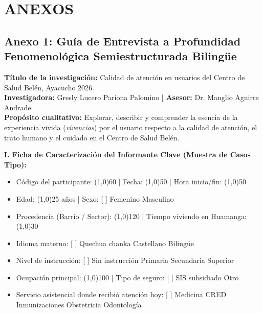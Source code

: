 \appendix
\section*{ANEXOS}
\label{sec:anexos}

\subsection*{Anexo 1: Guía de Entrevista a Profundidad Fenomenológica Semiestructurada Bilingüe}
\label{anx:1_guia}

\noindent\textbf{Título de la investigación:} Calidad de atención en usuarios del Centro de Salud Belén, Ayacucho 2026.\\
\textbf{Investigadora:} Gresly Lucero Pariona Palomino \quad | \quad \textbf{Asesor:} Dr. Manglio Aguirre Andrade.\\
\textbf{Propósito cualitativo:} Explorar, describir y comprender la esencia de la experiencia vivida (\textit{vivencias}) por el usuario respecto a la calidad de atención, el trato humano y el cuidado en el Centro de Salud Belén.

\vspace{0.3cm}
\noindent\textbf{I. Ficha de Caracterización del Informante Clave (Muestra de Casos Tipo):}
\begin{itemize}
    \item Código del participante: \line(1,0){60} \quad | \quad Fecha: \line(1,0){50} \quad | \quad Hora inicio/fin: \line(1,0){50}
    \item Edad: \line(1,0){25} años \quad | \quad Sexo: [ \phantom{X} ] Femenino \quad [ \phantom{X} ] Masculino
    \item Procedencia (Barrio / Sector): \line(1,0){120} \quad | \quad Tiempo viviendo en Huamanga: \line(1,0){30}
    \item Idioma materno: [ \phantom{X} ] Quechua chanka \quad [ \phantom{X} ] Castellano \quad [ \phantom{X} ] Bilingüe
    \item Nivel de instrucción: [ \phantom{X} ] Sin instrucción \quad [ \phantom{X} ] Primaria \quad [ \phantom{X} ] Secundaria \quad [ \phantom{X} ] Superior
    \item Ocupación principal: \line(1,0){100} \quad | \quad Tipo de seguro: [ \phantom{X} ] SIS subsidiado \quad [ \phantom{X} ] Otro
    \item Servicio asistencial donde recibió atención hoy: [ \phantom{X} ] Medicina \quad [ \phantom{X} ] CRED \quad [ \phantom{X} ] Inmunizaciones \quad [ \phantom{X} ] Obstetricia \quad [ \phantom{X} ] Odontología
\end{itemize}

